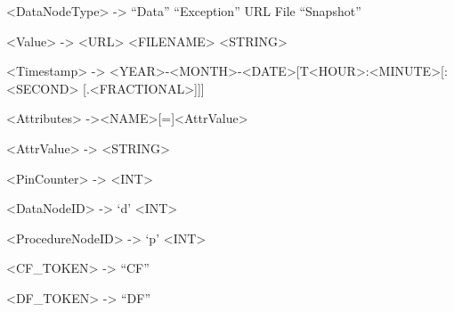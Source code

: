 \documentclass[letterpaper]{article}
\begin{document}
{\textless}DataNodeType{\textgreater} -{\textgreater} ``Data'' {\textbar} ``Exception'' {\textbar} {\textquotedbl}URL{\textquotedbl} {\textbar} {\textquotedbl}File{\textquotedbl} {\textbar} ``Snapshot''

{\textless}Value{\textgreater} -{\textgreater} {\textless}URL{\textgreater} {\textbar} {\textless}FILENAME{\textgreater} {\textbar} {\textless}STRING{\textgreater}

{\textless}Timestamp{\textgreater} -{\textgreater} {\textless}YEAR{\textgreater}{\textquotedbl}-{\textquotedbl}{\textless}MONTH{\textgreater}{\textquotedbl}-{\textquotedbl}{\textless}DATE{\textgreater}[{\textquotedbl}T{\textquotedbl}{\textless}HOUR{\textgreater}{\textquotedbl}:{\textquotedbl}{\textless}MINUTE{\textgreater}[{\textquotedbl}:{\textquotedbl}{\textless}SECOND{\textgreater} [{\textquotedbl}.{\textquotedbl}{\textless}FRACTIONAL{\textgreater}]]]

{\textless}Attributes{\textgreater} -{\textgreater}{\textless}NAME{\textgreater}[{\textquotedbl}={\textquotedbl}]{\textless}AttrValue{\textgreater}

{\textless}AttrValue{\textgreater} -{\textgreater} {\textless}STRING{\textgreater}

{\textless}PinCounter{\textgreater} -{\textgreater} {\textless}INT{\textgreater}

{\textless}DataNodeID{\textgreater} -{\textgreater} `d' {\textless}INT{\textgreater}

{\textless}ProcedureNodeID{\textgreater} -{\textgreater} `p' {\textless}INT{\textgreater}

{\textless}CF\_TOKEN{\textgreater} -{\textgreater} ``CF''

{\textless}DF\_TOKEN{\textgreater} -{\textgreater} ``DF''


\bigskip
\end{document}
